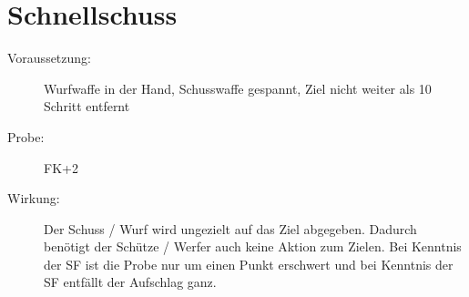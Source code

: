 \section{Schnellschuss}
\label{fernkampf.schnellschuss}
\begin{description}
    \item[Voraussetzung:]
        Wurfwaffe in der Hand, Schusswaffe gespannt, Ziel nicht weiter als 10 Schritt entfernt
    \item[Probe:]
        FK+2
    \item[Wirkung:]
        Der Schuss / Wurf wird ungezielt auf das Ziel abgegeben.
        Dadurch benötigt der Schütze / Werfer auch keine Aktion zum Zielen.
        Bei Kenntnis der SF  ist die Probe nur um einen Punkt erschwert und bei Kenntnis der SF  entfällt der Aufschlag ganz.
\end{description}
